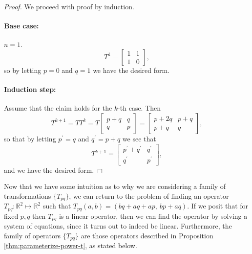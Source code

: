 \documentclass{article}
\begin{document}
\vspace{5mm}
\begin{proof}
  We proceed with proof by induction.
  \paragraph{Base case:} $n = 1$.
  \begin{equation*}
    T^1 =
    \begin{bmatrix}
      1 & 1 \\
      1 & 0
    \end{bmatrix},
  \end{equation*}
  so by letting $p = 0$ and $q = 1$ we have the desired form.

  \paragraph{Induction step:} Assume that the claim holds for the $k$-th case.
  Then
  \begin{equation*}
    T^{k + 1} = TT^k = T
    \begin{bmatrix}
      p + q & q \\
      q     & p
    \end{bmatrix}
    =
    \begin{bmatrix}
      p + 2q & p + q \\
      p + q  & q
    \end{bmatrix},
  \end{equation*}
  so that by letting $p^{\prime} = q$ and $q^{\prime} = p + q$ we see that
  \begin{equation*}
    T^{k + 1} =
    \begin{bmatrix}
      p^{\prime} + q^{\prime} & q^{\prime} \\
      q^{\prime}             & p^{\prime}
    \end{bmatrix},
  \end{equation*}
  and we have the desired form.
\end{proof}
\vspace{5mm}

Now that we have some intuition as to why we are considering a family of
transformations $\{T_{pq}\}$, we can return to the problem of finding an
operator $T_{pq}: \mathbb{R}^2 \mapsto \mathbb{R}^2$ such that
$T_{pq}(a, b) = (bq + aq + ap,~ bp + aq)$.  If we posit that for fixed $p, q$
then $T_{pq}$ is a linear operator, then we can find the operator by solving a
system of equations, since it turns out to indeed be linear.  Furthermore, the
family of operators $\{T_{pq}\}$ are those operators described in Proposition
\ref{thm:parameterize-power-t}, as stated below.
\end{document}
